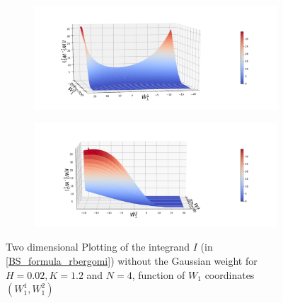 \documentclass[11pt]{article}
\begin{document}
\begin{figure}[h!]
\centering
\begin{subfigure}{.4\textwidth}
\centering
\includegraphics[width=1\linewidth]{./figures/integrand_plotting_rBergomi/2D_plots/N_4/integrand_without_density/H_002/Bergomi_integrand_contours_K_12_H_002_W1_1_2_N_4_without_weights_2_80}
\caption{}
\label{fig:sub3}
\end{subfigure}%
\begin{subfigure}{.4\textwidth}
\centering
\includegraphics[width=1\linewidth]{./figures/integrand_plotting_rBergomi/2D_plots/N_4/integrand_without_density/H_002/Bergomi_integrand_contours_K_12_H_002_W1_1_2_N_4_without_weights_2_0}
\caption{}
\label{fig:sub4}
\end{subfigure}



\caption{Two dimensional Plotting of the integrand $I$ (in \eqref{BS_formula_rbergomi}) without the Gaussian weight  for $H=0.02, K=1.2$ and $N=4$, function of $W_1$ coordinates $(W_1^1,W^2_1)$}
\label{fig:Two dimensional Plotting of the integrand $I$_W12_view_set17}
\end{figure}
\FloatBarrier
\end{document}
